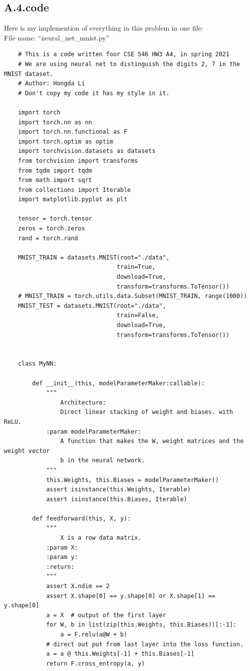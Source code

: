 \documentclass[]{article}
\begin{document}
    \subsection*{A.4.code}\label{A.4.code}
        Here is my implemention of everything in this problem in one file: 
        \\
        File name: ``neural\_net\_mnist.py''
        \begin{lstlisting}
    # This is a code written foor CSE 546 HW3 A4, in spring 2021
    # We are using neural net to distinguish the digits 2, 7 in the MNIST dataset.
    # Author: Hongda Li
    # Don't copy my code it has my style in it.

    import torch
    import torch.nn as nn
    import torch.nn.functional as F
    import torch.optim as optim
    import torchvision.datasets as datasets
    from torchvision import transforms
    from tqdm import tqdm
    from math import sqrt
    from collections import Iterable
    import matplotlib.pyplot as plt

    tensor = torch.tensor
    zeros = torch.zeros
    rand = torch.rand

    MNIST_TRAIN = datasets.MNIST(root="./data",
                                train=True,
                                download=True,
                                transform=transforms.ToTensor())
    # MNIST_TRAIN = torch.utils.data.Subset(MNIST_TRAIN, range(1000))
    MNIST_TEST = datasets.MNIST(root="./data",
                                train=False,
                                download=True,
                                transform=transforms.ToTensor())


    class MyNN:

        def __init__(this, modelParameterMaker:callable):
            """
                Architecture:
                Direct linear stacking of weight and biases. with ReLU.
            :param modelParameterMaker:
                A function that makes the W, weight matrices and the weight vector
                b in the neural network.
            """
            this.Weights, this.Biases = modelParameterMaker()
            assert isinstance(this.Weights, Iterable)
            assert isinstance(this.Biases, Iterable)

        def feedforward(this, X, y):
            """
                X is a row data matrix.
            :param X:
            :param y:
            :return:
            """
            assert X.ndim == 2
            assert X.shape[0] == y.shape[0] or X.shape[1] == y.shape[0]
            a = X  # output of the first layer
            for W, b in list(zip(this.Weights, this.Biases))[:-1]:
                a = F.relu(a@W + b)
            # direct out put from last layer into the loss function.
            a = a @ this.Weights[-1] + this.Biases[-1]
            return F.cross_entropy(a, y)


\end{lstlisting}
\end{document}
